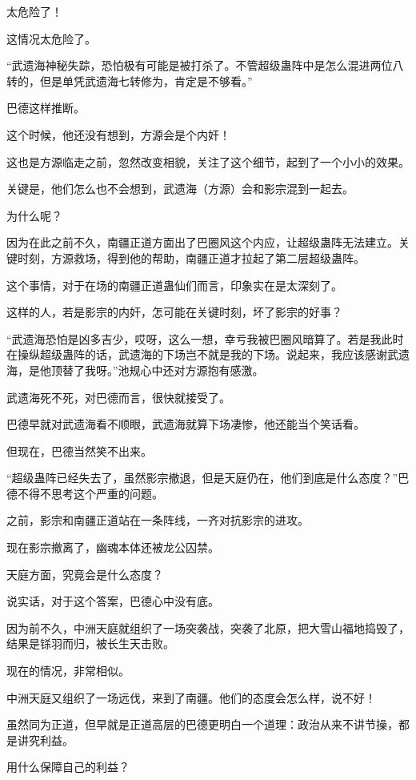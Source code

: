 \begin{this_body}
太危险了！

这情况太危险了。

“武遗海神秘失踪，恐怕极有可能是被打杀了。不管超级蛊阵中是怎么混进两位八转的，但是单凭武遗海七转修为，肯定是不够看。”

巴德这样推断。

这个时候，他还没有想到，方源会是个内奸！

这也是方源临走之前，忽然改变相貌，关注了这个细节，起到了一个小小的效果。

关键是，他们怎么也不会想到，武遗海（方源）会和影宗混到一起去。

为什么呢？

因为在此之前不久，南疆正道方面出了巴圈风这个内应，让超级蛊阵无法建立。关键时刻，方源救场，得到他的帮助，南疆正道才拉起了第二层超级蛊阵。

这个事情，对于在场的南疆正道蛊仙们而言，印象实在是太深刻了。

这样的人，若是影宗的内奸，怎可能在关键时刻，坏了影宗的好事？

“武遗海恐怕是凶多吉少，哎呀，这么一想，幸亏我被巴圈风暗算了。若是我此时在操纵超级蛊阵的话，武遗海的下场岂不就是我的下场。说起来，我应该感谢武遗海，是他顶替了我呀。”池规心中还对方源抱有感激。

武遗海死不死，对巴德而言，很快就接受了。

巴德早就对武遗海看不顺眼，武遗海就算下场凄惨，他还能当个笑话看。

但现在，巴德当然笑不出来。

“超级蛊阵已经失去了，虽然影宗撤退，但是天庭仍在，他们到底是什么态度？”巴德不得不思考这个严重的问题。

之前，影宗和南疆正道站在一条阵线，一齐对抗影宗的进攻。

现在影宗撤离了，幽魂本体还被龙公囚禁。

天庭方面，究竟会是什么态度？

说实话，对于这个答案，巴德心中没有底。

因为前不久，中洲天庭就组织了一场突袭战，突袭了北原，把大雪山福地捣毁了，结果是铩羽而归，被长生天击败。

现在的情况，非常相似。

中洲天庭又组织了一场远伐，来到了南疆。他们的态度会怎么样，说不好！

虽然同为正道，但早就是正道高层的巴德更明白一个道理：政治从来不讲节操，都是讲究利益。

用什么保障自己的利益？


\end{this_body}
